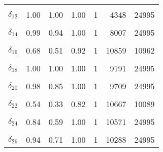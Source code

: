 \begin{table}
\begin{tabular}[t]{lrrrrrr}
\cellcolor{gray!6}{$\delta_{11}$} & \cellcolor{gray!6}{0.63} & \cellcolor{gray!6}{0.41} & \cellcolor{gray!6}{0.97} & \cellcolor{gray!6}{1} & \cellcolor{gray!6}{10114} & \cellcolor{gray!6}{11479}\\
$\delta_{12}$ & 1.00 & 1.00 & 1.00 & 1 & 4348 & 24995\\
\cellcolor{gray!6}{$\delta_{13}$} & \cellcolor{gray!6}{1.00} & \cellcolor{gray!6}{1.00} & \cellcolor{gray!6}{1.00} & \cellcolor{gray!6}{1} & \cellcolor{gray!6}{7794} & \cellcolor{gray!6}{24995}\\
$\delta_{14}$ & 0.99 & 0.94 & 1.00 & 1 & 8007 & 24995\\
\cellcolor{gray!6}{$\delta_{15}$} & \cellcolor{gray!6}{1.00} & \cellcolor{gray!6}{1.00} & \cellcolor{gray!6}{1.00} & \cellcolor{gray!6}{1} & \cellcolor{gray!6}{10606} & \cellcolor{gray!6}{24995}\\
$\delta_{16}$ & 0.68 & 0.51 & 0.92 & 1 & 10859 & 10962\\
\cellcolor{gray!6}{$\delta_{17}$} & \cellcolor{gray!6}{0.74} & \cellcolor{gray!6}{0.56} & \cellcolor{gray!6}{0.98} & \cellcolor{gray!6}{1} & \cellcolor{gray!6}{10616} & \cellcolor{gray!6}{10015}\\
$\delta_{18}$ & 1.00 & 1.00 & 1.00 & 1 & 9191 & 24995\\
\cellcolor{gray!6}{$\delta_{19}$} & \cellcolor{gray!6}{1.00} & \cellcolor{gray!6}{1.00} & \cellcolor{gray!6}{1.00} & \cellcolor{gray!6}{1} & \cellcolor{gray!6}{8567} & \cellcolor{gray!6}{24995}\\
$\delta_{20}$ & 0.98 & 0.85 & 1.00 & 1 & 9709 & 24995\\
\cellcolor{gray!6}{$\delta_{21}$} & \cellcolor{gray!6}{0.85} & \cellcolor{gray!6}{0.57} & \cellcolor{gray!6}{1.00} & \cellcolor{gray!6}{1} & \cellcolor{gray!6}{10446} & \cellcolor{gray!6}{24995}\\
$\delta_{22}$ & 0.54 & 0.33 & 0.82 & 1 & 10667 & 10089\\
\cellcolor{gray!6}{$\delta_{23}$} & \cellcolor{gray!6}{0.94} & \cellcolor{gray!6}{0.76} & \cellcolor{gray!6}{1.00} & \cellcolor{gray!6}{1} & \cellcolor{gray!6}{9778} & \cellcolor{gray!6}{24995}\\
$\delta_{24}$ & 0.84 & 0.59 & 1.00 & 1 & 10571 & 24995\\
\cellcolor{gray!6}{$\delta_{25}$} & \cellcolor{gray!6}{0.85} & \cellcolor{gray!6}{0.59} & \cellcolor{gray!6}{1.00} & \cellcolor{gray!6}{1} & \cellcolor{gray!6}{10082} & \cellcolor{gray!6}{24995}\\
$\delta_{26}$ & 0.94 & 0.71 & 1.00 & 1 & 10288 & 24995\\

\end{tabular}
\end{table}
